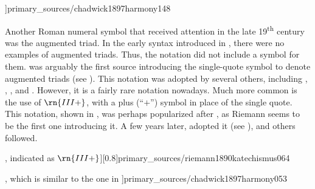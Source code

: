 \phdfigure[\gls{neapolitan} in
\textcite[148]{chadwick1897harmony}]{primary_sources/chadwick1897harmony148}

Another Roman numeral symbol that received attention in the
late 19\textsuperscript{th} century was the augmented triad.
In the early syntax introduced in
\textcite{weber1818versuch}, there were no examples of
augmented triads. Thus, the notation did not include a
symbol for them. \textcite{richter1860lehrbuch} was arguably
the first source introducing the single-quote symbol to
denote augmented triads (see
). This
notation was adopted by several others, including
\textcite{jadassohn1883lehrbuch},
\textcite{broekhoven1889system}, \textcite{buwa1893schule},
and \textcite{shepard1896harmony}. However, it is a fairly
rare notation nowadays. Much more common is the use of
$\rn{III+}$, with a plus (``$+$'') symbol in place of the single
quote. This notation, shown in
, was
perhaps popularized after \textcite{riemann1890katechismus},
as Riemann seems to be the first one introducing it. A few
years later, \textcite{chadwick1897harmony} adopted it (see
), and others
followed. 

\phdfigure[Augmented triads in
\textcite[64]{riemann1890katechismus}, indicated as
$\rn{III+}$][0.8]{primary_sources/riemann1890katechismus064}

\phdfigure[The notation for augmented triads in
\textcite[53]{chadwick1897harmony}, which is similar to
the one in
\textcite{riemann1890katechismus}]{primary_sources/chadwick1897harmony053}
